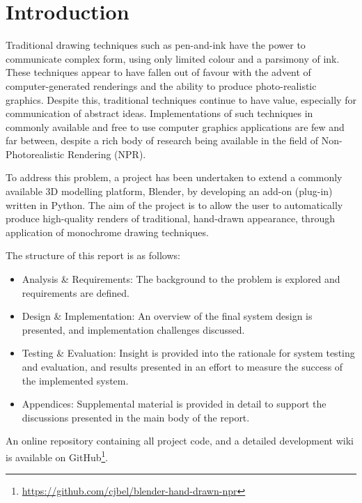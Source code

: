 

\chapter{Introduction}\label{intro}

Traditional drawing techniques such as pen-and-ink have the power to communicate complex form, using only limited colour and a parsimony of ink.
These techniques appear to have fallen out of favour with the advent of computer-generated renderings and the ability to produce photo-realistic graphics.
Despite this, traditional techniques continue to have value, especially for communication of abstract ideas.
Implementations of such techniques in commonly available and free to use computer graphics applications are few and far between, despite a rich body of research being available in the field of Non-Photorealistic Rendering (NPR).

To address this problem, a project has been undertaken to extend a commonly available 3D modelling platform, Blender, by developing an add-on (plug-in) written in Python. The aim of the project is to allow the user to automatically produce high-quality renders of traditional, hand-drawn appearance, through application of monochrome drawing techniques.

The structure of this report is as follows:

\begin{itemize}
	\item{Analysis \& Requirements: The background to the problem is explored and requirements are defined.}
	\item{Design \& Implementation: An overview of the final system design is presented, and implementation challenges discussed.}
	\item{Testing \& Evaluation: Insight is provided into the rationale for system testing and evaluation, and results presented in an effort to measure the success of the implemented system.}
	\item{Appendices: Supplemental material is provided in detail to support the discussions presented in the main body of the report.}
\end{itemize}

An online repository containing all project code, and a detailed development wiki is available on GitHub\footnote{\url{https://github.com/cjbel/blender-hand-drawn-npr}}.